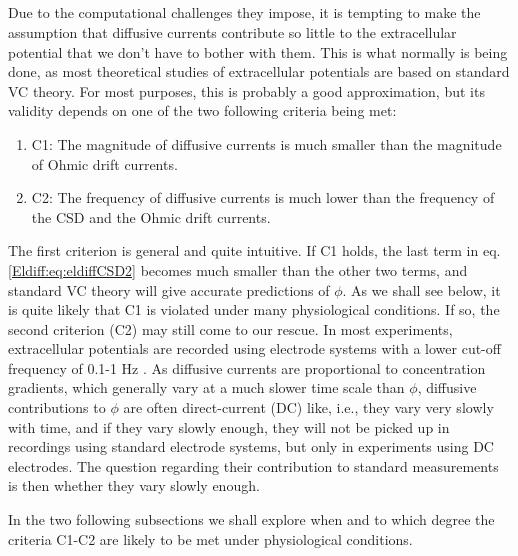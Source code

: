 \subsection{}
\label{sec:Eldiff:estimates}
Due to the computational challenges they impose, it is tempting to make the assumption that diffusive currents contribute so little to the extracellular potential that we don't have to bother with them. This is what normally is being done, as most theoretical studies of extracellular potentials are based on standard VC theory. For most purposes, this is probably a good approximation, but its validity depends on one of the two following criteria being met:

\begin{enumerate}
\item C1: The magnitude of diffusive currents is much smaller than the magnitude of Ohmic drift currents.
\item C2: The frequency of diffusive currents is much lower than the frequency of the CSD and the Ohmic drift currents. 
\end{enumerate}

The first criterion is general and quite intuitive. If C1 holds, the last term in eq. \ref{Eldiff:eq:eldiffCSD2} becomes much smaller than the other two terms, and standard VC theory will give accurate predictions of $\phi$. As we shall see below, it is quite likely that C1 is violated under many physiological conditions. If so, the second criterion (C2) may still come to our rescue. In most experiments, extracellular potentials are recorded using electrode systems with a lower cut-off frequency of 0.1-1 Hz \citep{Einevoll2007}. As diffusive currents are proportional to concentration gradients, which generally vary at a much slower time scale than $\phi$, diffusive contributions to $\phi$ are often direct-current (DC) like, i.e., they vary very slowly with time, and if they vary slowly enough, they will not be picked up in recordings using standard electrode systems, but only in experiments using DC electrodes. The question regarding their contribution to standard measurements is then whether they vary slowly enough. 

In the two following subsections we shall explore when and to which degree the criteria C1-C2 are likely to be met under physiological conditions.

